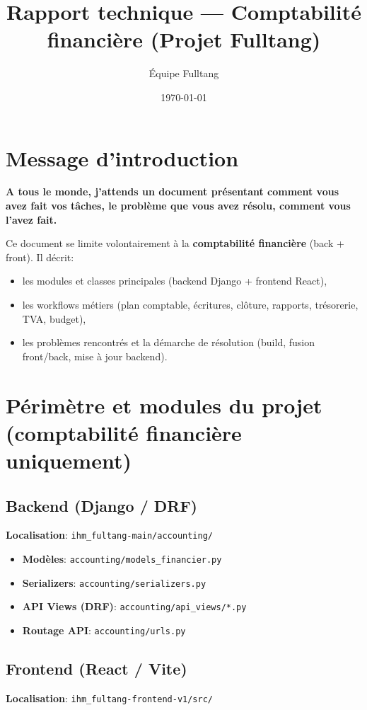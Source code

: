 \documentclass[12pt,a4paper]{article}
\title{Rapport technique --- Comptabilité financière (Projet Fulltang)}
\author{Équipe Fulltang}
\date{\today}
\begin{document}
\maketitle
\tableofcontents
\newpage

\section{Message d’introduction}
\textbf{A tous le monde, j’attends un document présentant comment vous avez fait vos tâches, le problème que vous avez résolu, comment vous l’avez fait.}

\vspace{0.5cm}
Ce document se limite volontairement à la \textbf{comptabilité financière} (back + front). Il décrit:
\begin{itemize}[leftmargin=1.2cm]
  \item les modules et classes principales (backend Django + frontend React),
  \item les workflows métiers (plan comptable, écritures, clôture, rapports, trésorerie, TVA, budget),
  \item les problèmes rencontrés et la démarche de résolution (build, fusion front/back, mise à jour backend).
\end{itemize}

\section{Périmètre et modules du projet (comptabilité financière uniquement)}

\subsection{Backend (Django / DRF)}
\textbf{Localisation}: \texttt{ihm\_fultang-main/accounting/}

\begin{itemize}[leftmargin=1.2cm]
  \item \textbf{Modèles}: \texttt{accounting/models\_financier.py}
  \item \textbf{Serializers}: \texttt{accounting/serializers.py}
  \item \textbf{API Views (DRF)}: \texttt{accounting/api\_views/*.py}
  \item \textbf{Routage API}: \texttt{accounting/urls.py}
\end{itemize}

\subsection{Frontend (React / Vite)}
\textbf{Localisation}: \texttt{ihm\_fultang-frontend-v1/src/}
\end{document}
